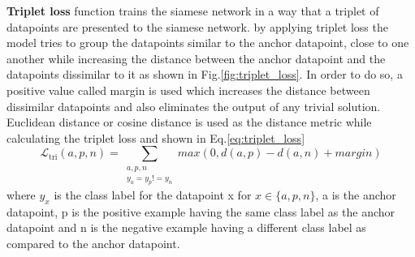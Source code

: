 \textbf{Triplet loss} function\cite*{weinberger2009distance} trains the siamese network in a way that a triplet of datapoints are presented to the siamese network. by applying triplet loss the model tries to group the datapoints similar to the anchor datapoint, close to one another while increasing the distance between the anchor datapoint and the datapoints dissimilar to it as shown in Fig.\ref*{fig:triplet_loss}. In order to do so, a positive value called margin is used which increases the distance between dissimilar datapoints and also eliminates the output of any trivial solution. Euclidean distance or cosine distance is used as the distance metric while calculating the triplet loss and shown in Eq.\ref*{eq:triplet_loss}\cite*{hermans2017defense,siamese_network}
\begin{equation}
  \label{eq:triplet_loss}
  \mathcal{L}_{\textrm{tri}}(a,p,n)=\sum_{\substack{a,p,n \\ y_{a}=y_{p}!=y_{n}}} max(0,d(a,p)-d(a,n)+margin)
\end{equation}
where $y_{x}$ is the class label for the datapoint x for $x \in \{a,p,n\}$, a is the anchor datapoint, p is the positive example having the same class label as the anchor datapoint and n is the negative example having a different class label as compared to the anchor datapoint.
